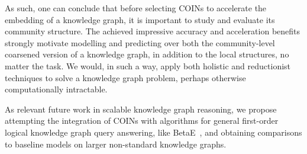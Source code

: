 As such, one can conclude that before selecting COINs to accelerate the embedding of a knowledge graph, it is important to study and evaluate its community structure. The achieved impressive accuracy and acceleration benefits strongly motivate modelling and predicting over both the community-level coarsened version of a knowledge graph, in addition to the local structures, no matter the task. We would, in such a way, apply both holistic and reductionist techniques to solve a knowledge graph problem, perhaps otherwise computationally intractable.

As relevant future work in scalable knowledge graph reasoning, we propose attempting the integration of COINs with algorithms for general first-order logical knowledge graph query answering, like BetaE~\cite{ren_beta_2020}, and obtaining comparisons to baseline models on larger non-standard knowledge graphs.